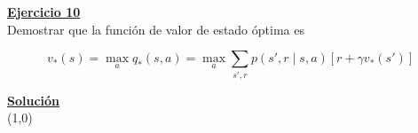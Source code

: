 \indent\underline{\textbf{Ejercicio 10}}\\
Demostrar que la función de valor de estado óptima es

\[
    v_{\ast}(s) = \max_{a} q_{\ast}(s, a) = \max_{a} \sum_{s',r} p(s', r \mid s, a) [r + \gamma v_{\ast}(s')]
\]

\indent\underline{\textbf{Solución}}\\

\line(1,0){\textwidth}
